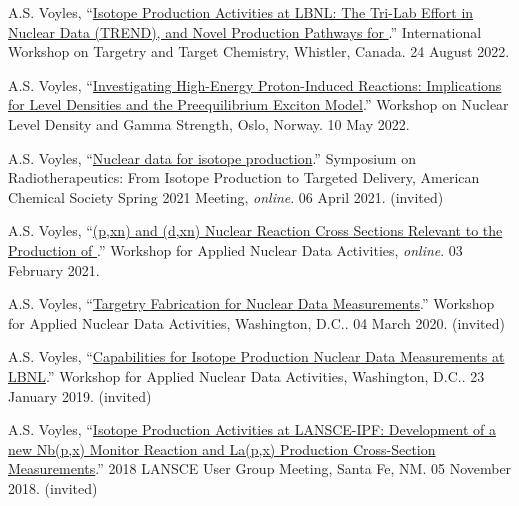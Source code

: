 \begin{bibsection}

\item A.S. Voyles, \enquote{\href{https://meetings.triumf.ca/event/108/contributions/3718/}{Isotope Production Activities at LBNL: The Tri-Lab Effort in Nuclear Data (TREND), and Novel Production Pathways for }.}  International Workshop on Targetry and Target Chemistry, Whistler, Canada. 24 August 2022.

\item A.S. Voyles, \enquote{\href{https://www.mn.uio.no/fysikk/english/research/news-and-events/events/conferences/gamma8/program/book_of_abstracts.pdf}{Investigating High-Energy Proton-Induced Reactions: Implications for Level Densities and the Preequilibrium Exciton Model}.}   Workshop on Nuclear Level Density and Gamma Strength, Oslo, Norway. 10 May 2022.

\item A.S. Voyles, \enquote{\href{https://www.morressier.com/o/event/6022c0c2e8bb0500118660c6/article/609136b66e987178c2dc86ae}{Nuclear data for isotope production}.} Symposium on Radiotherapeutics: From Isotope Production to Targeted
Delivery, American Chemical Society Spring 2021 Meeting, \emph{online}. 06 April 2021. (invited)


\item A.S. Voyles, \enquote{\href{https://conferences.lbl.gov/event/504/}{(p,xn) and (d,xn)  Nuclear Reaction Cross Sections Relevant to the Production of }.} Workshop for Applied Nuclear Data Activities, \emph{online}. 03 February 2021.

\item A.S. Voyles, \enquote{\href{https://conferences.lbl.gov/event/292/}{Targetry Fabrication for Nuclear Data Measurements}.} Workshop for Applied Nuclear Data Activities, Washington, D.C.. 04 March 2020. (invited)

\item A.S. Voyles, \enquote{\href{https://conferences.lbl.gov/event/198/}{Capabilities for Isotope Production Nuclear Data Measurements at LBNL}.} Workshop for Applied Nuclear Data Activities, Washington, D.C.. 23 January 2019. (invited)

\item A.S. Voyles, \enquote{\href{https://lansce.lanl.gov/lug2018.php}{Isotope Production Activities at LANSCE-IPF: Development of a new Nb(p,x) Monitor Reaction and La(p,x) Production Cross-Section Measurements}.} 2018 LANSCE User Group Meeting, Santa Fe, NM. 05 November 2018. (invited)


\end{bibsection}
